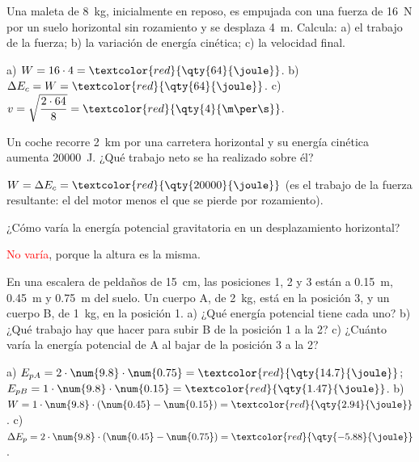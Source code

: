 \begin{exercise}
    Una maleta de \qty{8}{\kg}, inicialmente en reposo, es empujada con una fuerza de \qty{16}{\newton} por un suelo horizontal sin rozamiento y se desplaza \qty{4}{\m}. Calcula: a) el trabajo de la fuerza; b) la variación de energía cinética; c) la velocidad final.
    \begin{solu}
        a) \(W = 16 \cdot 4 = \textcolor{red}{\qty{64}{\joule}}\). b) \(\Delta E_c = W = \textcolor{red}{\qty{64}{\joule}}\). c) \(v = \sqrt{\dfrac{2 \cdot 64}{8}} = \textcolor{red}{\qty{4}{\m\per\s}}\).
    \end{solu}
\end{exercise}

\begin{exercise}
    Un coche recorre \qty{2}{\km} por una carretera horizontal y su energía cinética aumenta \qty{20000}{\joule}. ¿Qué trabajo neto se ha realizado sobre él?
    \begin{solu}
        \(W = \Delta E_c = \textcolor{red}{\qty{20000}{\joule}}\) (es el trabajo de la fuerza resultante: el del motor menos el que se pierde por rozamiento).
    \end{solu}
\end{exercise}

\begin{exercise}
    ¿Cómo varía la energía potencial gravitatoria en un desplazamiento horizontal?
    \begin{solu}
        \textcolor{red}{No varía}, porque la altura es la misma.
    \end{solu}
\end{exercise}

\begin{exercise}
    En una escalera de peldaños de \qty{15}{\cm}, las posiciones 1, 2 y 3 están a \qty{0.15}{\m}, \qty{0.45}{\m} y \qty{0.75}{\m} del suelo. Un cuerpo A, de \qty{2}{\kg}, está en la posición 3, y un cuerpo B, de \qty{1}{\kg}, en la posición 1. a) ¿Qué energía potencial tiene cada uno? b) ¿Qué trabajo hay que hacer para subir B de la posición 1 a la 2? c) ¿Cuánto varía la energía potencial de A al bajar de la posición 3 a la 2?
    \begin{solu}
        a) \(E_{pA} = 2 \cdot \num{9.8} \cdot \num{0.75} = \textcolor{red}{\qty{14.7}{\joule}}\); \(E_{pB} = 1 \cdot \num{9.8} \cdot \num{0.15} = \textcolor{red}{\qty{1.47}{\joule}}\).
        b) \(W = 1 \cdot \num{9.8} \cdot (\num{0.45} - \num{0.15}) = \textcolor{red}{\qty{2.94}{\joule}}\).
        c) \(\Delta E_p = 2 \cdot \num{9.8} \cdot (\num{0.45} - \num{0.75}) = \textcolor{red}{\qty{-5.88}{\joule}}\).
    \end{solu}
\end{exercise}

